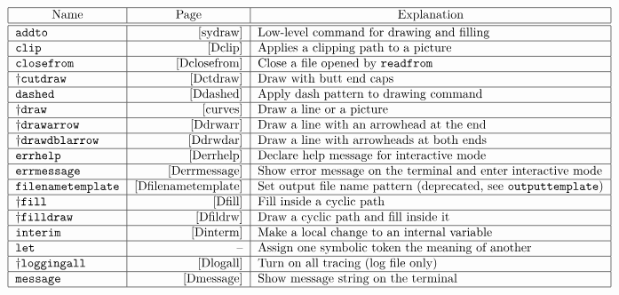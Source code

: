 \begin{table}[htp]
\caption{Commands}
$$\begin{tabular}{|l|r|l|}
\hline
\multicolumn1{|c}{Name}&  \multicolumn1{|c}{Page}&  \multicolumn1{|c|}{Explanation}\\
\hline
\hline
\tt \verb|addto|&       \pageref{sydraw}&
        Low-level command for drawing and filling\\\hline
\tt \verb|clip|&        \pageref{Dclip}&
        Applies a clipping path to a picture\\\hline
\tt \verb|closefrom|&  \pageref{Dclosefrom}&
        Close a file opened by {\tt readfrom}\\\hline
\pl\tt \verb|cutdraw|&  \pageref{Dctdraw}&
        Draw with butt end caps\\\hline
\tt \verb|dashed|&     \pageref{Ddashed}&
        Apply dash pattern to drawing command\\\hline
\pl\tt \verb|draw|&     \pageref{curves}&
        Draw a line or a picture\\\hline
\pl\tt \verb|drawarrow|&        \pageref{Ddrwarr}&
        Draw a line with an arrowhead at the end\\\hline
\pl\tt \verb|drawdblarrow|&     \pageref{Ddrwdar}&
        Draw a line with arrowheads at both ends\\\hline
\tt \verb|errhelp|& \pageref{Derrhelp}&
        Declare help message for interactive mode\\\hline
\tt \verb|errmessage|& \pageref{Derrmessage}&
        Show error message on the terminal and enter interactive
        mode\\\hline
\tt \verb|filenametemplate|& \pageref{Dfilenametemplate}&
        Set output file name pattern (deprecated, see
        \verb|outputtemplate|)\\\hline
\pl\tt \verb|fill|&     \pageref{Dfill}&
        Fill inside a cyclic path\\\hline
\pl\tt \verb|filldraw|& \pageref{Dfildrw}&
        Draw a cyclic path and fill inside it\\\hline
\tt \verb|interim|&     \pageref{Dinterm}&
        Make a local change to an internal variable\\\hline
\tt \verb|let|& --&
        Assign one symbolic token the meaning of another\\\hline
\pl\tt \verb|loggingall|&       \pageref{Dlogall}&
        Turn on all tracing (log file only)\\\hline
\tt \verb|message|& \pageref{Dmessage}&
        Show message string on the terminal\\\hline

\end{tabular}$$
\end{table}

